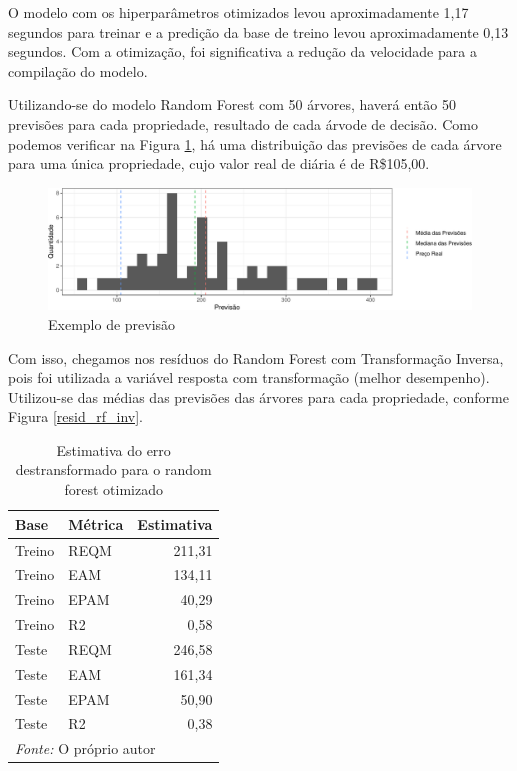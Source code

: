 \documentclass[
	12pt,				%
	a4paper,		%
	oneside,    %
	chapter=TITLE,		   %
	section=TITLE,		   %
	subsection=TITLE,	   %
	subsubsection=TITLE, %
	english,			%
	french,				%
	spanish,			%
	brazil,				%
]{abntex2}
\begin{document}
O modelo com os hiperparâmetros otimizados levou aproximadamente 1,17
segundos para treinar e a predição da base de treino levou
aproximadamente 0,13 segundos. Com a otimização, foi significativa a
redução da velocidade para a compilação do modelo.

Utilizando-se do modelo Random Forest com 50 árvores, haverá então 50
previsões para cada propriedade, resultado de cada árvode de decisão.
Como podemos verificar na Figura \ref{exemplo_pred}, há uma distribuição
das previsões de cada árvore para uma única propriedade, cujo valor real
de diária é de R\$105,00.

\begin{figure}
\centering
\includegraphics{00-TCC_files/figure-latex/exemplo_pred-1.pdf}
\caption{\label{exemplo_pred}Exemplo de previsão}
\end{figure}

Com isso, chegamos nos resíduos do Random Forest com Transformação
Inversa, pois foi utilizada a variável resposta com transformação
(melhor desempenho). Utilizou-se das médias das previsões das árvores
para cada propriedade, conforme Figura \ref{resid_rf_inv}.

\begin{table}

\caption{\label{tab:rf1_metricas}Estimativa do erro destransformado para o random forest otimizado}
\centering
\begin{tabular}[t]{l|l|r}
\hline
Base & Métrica & Estimativa\\
\hline
Treino & REQM & 211,31\\
\hline
Treino & EAM & 134,11\\
\hline
Treino & EPAM & 40,29\\
\hline
Treino & R2 & 0,58\\
\hline
Teste & REQM & 246,58\\
\hline
Teste & EAM & 161,34\\
\hline
Teste & EPAM & 50,90\\
\hline
Teste & R2 & 0,38\\
\hline
\multicolumn{3}{l}{\textit{Fonte: } O próprio autor}\\
\end{tabular}
\end{table}
\end{document}
